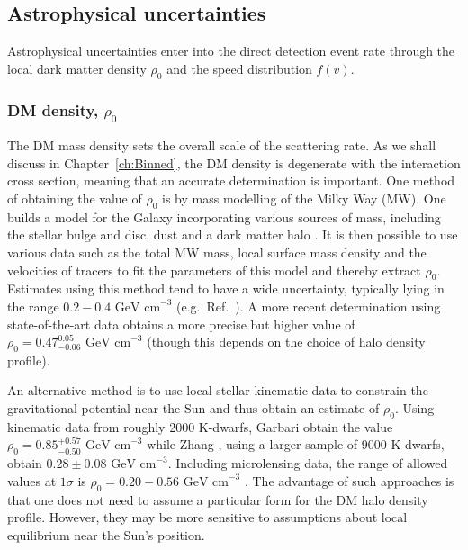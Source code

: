
\subsection{Astrophysical uncertainties}

Astrophysical uncertainties enter into the direct detection event rate through the local dark matter density $\rho_0$ and the speed distribution $f(v)$. 

\subsubsection{DM density, $\rho_0$}

The DM mass density sets the overall scale of the scattering rate. As we shall discuss in Chapter~\ref{ch:Binned}, the DM density is degenerate with the interaction cross section, meaning that an accurate determination is important. One method of obtaining the value of $\rho_0$ is by mass modelling of the Milky Way (MW). One builds a model for the Galaxy incorporating various sources of mass, including the stellar bulge and disc, dust and a dark matter halo \cite{Catena:2010}. It is then possible to use various data such as the total MW mass, local surface mass density and the velocities of tracers  to fit the parameters of this model and thereby extract $\rho_0$. Estimates using this method tend to have a wide uncertainty, typically lying in the range \(0.2 - 0.4 \textrm{ GeV cm}^{-3}\) (e.g.\ Ref.\ \cite{Catena:2010,Weber:2010}). A more recent determination using state-of-the-art data obtains a more precise but higher value of $\rho_0 = 0.47_{-0.06}^{0.05} \textrm{ GeV cm}^{-3}$ \cite{Nesti:2013} (though this depends on the choice of halo density profile). 

An alternative method is to use local stellar kinematic data to constrain the gravitational potential near the Sun and thus obtain an estimate of $\rho_0$. Using kinematic data from roughly 2000 K-dwarfs, Garbari \etal \cite{Garbari:2012} obtain the value \(\rho_0 = 0.85_{-0.50}^{+0.57} \textrm{ GeV cm}^{-3}\) while Zhang \etal, using a larger sample of 9000 K-dwarfs, obtain $0.28\pm0.08 \textrm{ GeV cm}^{-3}$. Including microlensing data, the range of allowed values at $1\sigma$ is $\rho_0 = 0.20-0.56 \textrm{ GeV cm}^{-3}$ \cite{Iocco:2011}. The advantage of such approaches is that one does not need to assume a particular form for the DM halo density profile. However, they may be more sensitive to assumptions about local equilibrium near the Sun's position.

